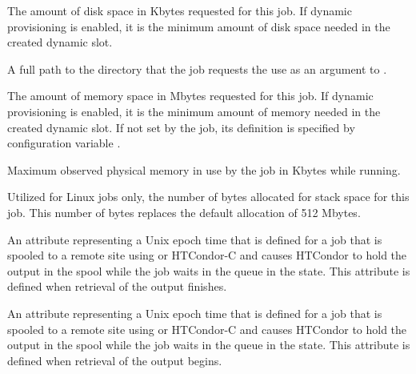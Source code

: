 \begin{description}
\item[\AdAttr{RequestDisk}:]  The amount of disk space in Kbytes requested 
for this job.
If dynamic  provisioning is enabled,
it is the minimum amount of disk space needed in the created dynamic slot.

\item[\AdAttr{RequestedChroot}:]  A full path to the directory that the job
requests the  use as an argument to .

\item[\AdAttr{RequestMemory}:]  The amount of memory space in Mbytes 
requested for this job.
If dynamic  provisioning is enabled,
it is the minimum amount of memory needed in the created dynamic slot.
If not set by the job, its definition is specified by 
configuration variable .

\item[\AdAttr{ResidentSetSize}:]  Maximum observed
physical memory in use by the job in Kbytes while running.

\item[\AdAttr{StackSize}:]   
Utilized for Linux jobs only, 
the number of bytes allocated for stack space for this job.
This number of bytes replaces the default allocation of 512 Mbytes.

\item[\AdAttr{StageOutFinish}:]   
An attribute representing a Unix epoch time that is defined for a job that is
spooled to a remote site using  or HTCondor-C
and causes HTCondor to hold the output in the spool while the job waits 
in the queue in the  state.
This attribute is defined when retrieval of the output finishes.

\item[\AdAttr{StageOutStart}:]   
An attribute representing a Unix epoch time that is defined for a job that is
spooled to a remote site using  or HTCondor-C
and causes HTCondor to hold the output in the spool while the job waits 
in the queue in the  state.
This attribute is defined when retrieval of the output begins.


\end{description}
